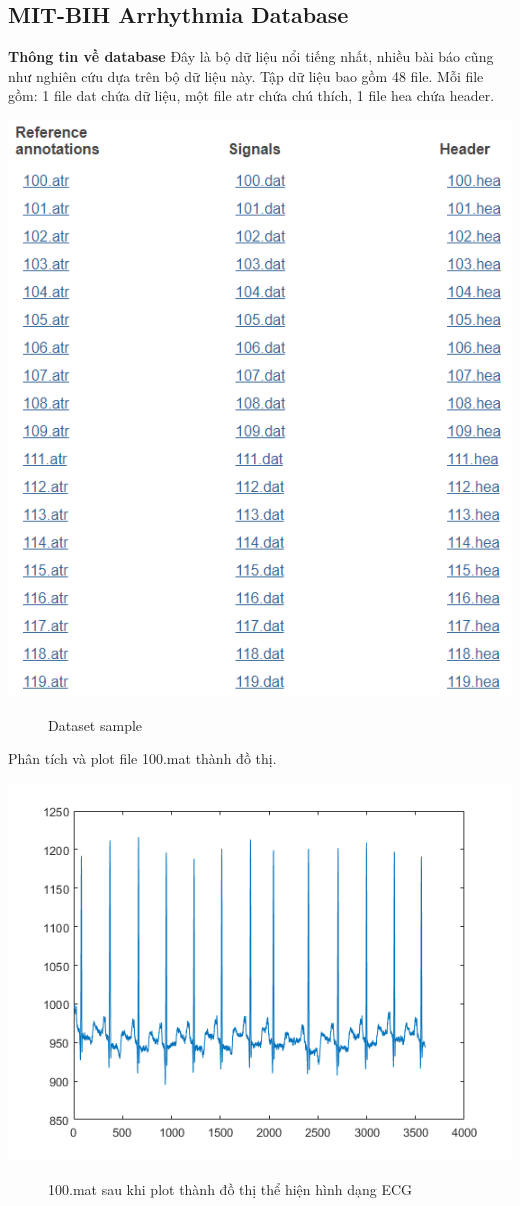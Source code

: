 \subsection{MIT-BIH Arrhythmia Database}
\textbf{Thông tin về database}
Đây là bộ dữ liệu nổi tiếng nhất, nhiều bài báo cũng như nghiên cứu dựa trên bộ dữ liệu này. Tập dữ liệu bao gồm 48 file. Mỗi file gồm: 1 file dat chứa dữ liệu, một file atr chứa chú thích, 1 file hea chứa header.
\begin{center}
    \includegraphics[scale=.4]{image/week3/mit.png}
    \begin{figure}[htp]
    \begin{center}
    \end{center}
    \caption{Dataset sample}
    \end{figure}
\end{center}
Phân tích và plot file 100.mat thành đồ thị.
\begin{center}
    \includegraphics[scale=.8]{image/week4/100dat.png}
    \begin{figure}[htp]
    \begin{center}
    \end{center}
    \caption{100.mat sau khi plot thành đồ thị thể hiện hình dạng ECG}
    \end{figure}
\end{center}
